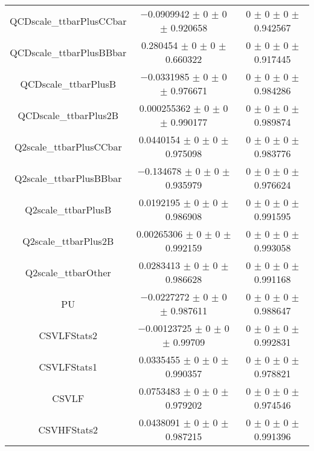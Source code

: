 \begin{table}
\begin{tabular}{ccc}
QCDscale\_ttbarPlusCCbar 	& \num{-0.0909942} $\pm$ \num{0} $\pm$ \num{0} $\pm$ \num{0.920658} 	& \num{0} $\pm$ \num{0} $\pm$ \num{0} $\pm$ \num{0.942567}\\
QCDscale\_ttbarPlusBBbar 	& \num{0.280454} $\pm$ \num{0} $\pm$ \num{0} $\pm$ \num{0.660322} 	& \num{0} $\pm$ \num{0} $\pm$ \num{0} $\pm$ \num{0.917445}\\
QCDscale\_ttbarPlusB 	& \num{-0.0331985} $\pm$ \num{0} $\pm$ \num{0} $\pm$ \num{0.976671} 	& \num{0} $\pm$ \num{0} $\pm$ \num{0} $\pm$ \num{0.984286}\\
QCDscale\_ttbarPlus2B 	& \num{0.000255362} $\pm$ \num{0} $\pm$ \num{0} $\pm$ \num{0.990177} 	& \num{0} $\pm$ \num{0} $\pm$ \num{0} $\pm$ \num{0.989874}\\
Q2scale\_ttbarPlusCCbar 	& \num{0.0440154} $\pm$ \num{0} $\pm$ \num{0} $\pm$ \num{0.975098} 	& \num{0} $\pm$ \num{0} $\pm$ \num{0} $\pm$ \num{0.983776}\\
Q2scale\_ttbarPlusBBbar 	& \num{-0.134678} $\pm$ \num{0} $\pm$ \num{0} $\pm$ \num{0.935979} 	& \num{0} $\pm$ \num{0} $\pm$ \num{0} $\pm$ \num{0.976624}\\
Q2scale\_ttbarPlusB 	& \num{0.0192195} $\pm$ \num{0} $\pm$ \num{0} $\pm$ \num{0.986908} 	& \num{0} $\pm$ \num{0} $\pm$ \num{0} $\pm$ \num{0.991595}\\
Q2scale\_ttbarPlus2B 	& \num{0.00265306} $\pm$ \num{0} $\pm$ \num{0} $\pm$ \num{0.992159} 	& \num{0} $\pm$ \num{0} $\pm$ \num{0} $\pm$ \num{0.993058}\\
Q2scale\_ttbarOther 	& \num{0.0283413} $\pm$ \num{0} $\pm$ \num{0} $\pm$ \num{0.986628} 	& \num{0} $\pm$ \num{0} $\pm$ \num{0} $\pm$ \num{0.991168}\\
PU 	& \num{-0.0227272} $\pm$ \num{0} $\pm$ \num{0} $\pm$ \num{0.987611} 	& \num{0} $\pm$ \num{0} $\pm$ \num{0} $\pm$ \num{0.988647}\\
CSVLFStats2 	& \num{-0.00123725} $\pm$ \num{0} $\pm$ \num{0} $\pm$ \num{0.99709} 	& \num{0} $\pm$ \num{0} $\pm$ \num{0} $\pm$ \num{0.992831}\\
CSVLFStats1 	& \num{0.0335455} $\pm$ \num{0} $\pm$ \num{0} $\pm$ \num{0.990357} 	& \num{0} $\pm$ \num{0} $\pm$ \num{0} $\pm$ \num{0.978821}\\
CSVLF 	& \num{0.0753483} $\pm$ \num{0} $\pm$ \num{0} $\pm$ \num{0.979202} 	& \num{0} $\pm$ \num{0} $\pm$ \num{0} $\pm$ \num{0.974546}\\
CSVHFStats2 	& \num{0.0438091} $\pm$ \num{0} $\pm$ \num{0} $\pm$ \num{0.987215} 	& \num{0} $\pm$ \num{0} $\pm$ \num{0} $\pm$ \num{0.991396}\\

\end{tabular}
\end{table}
